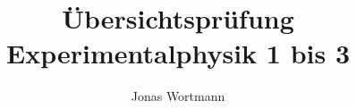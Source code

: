 \documentclass[a4paper,12pt]{article}
\numberwithin{equation}{section}
\begin{document}

\title{Übersichtsprüfung Experimentalphysik 1 bis 3}
\author{Jonas Wortmann}
\maketitle
{}


\newpage


\fancyhead[L]{\thepage}
\fancyfoot[C]{}

\tableofcontents


\newpage


\fancyhead[R]{\leftmark\\\rightmark}






\end{document}
